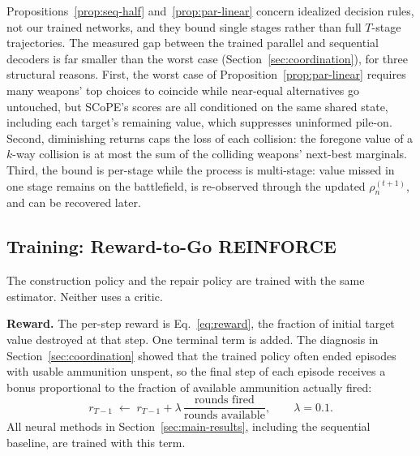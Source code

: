\begin{remark}
\label{rem:gap-interpretation}
Propositions~\ref{prop:seq-half} and~\ref{prop:par-linear} concern idealized decision rules, not our trained networks, and they bound single stages rather than full $T$-stage trajectories. The measured gap between the trained parallel and sequential decoders is far smaller than the worst case (Section~\ref{sec:coordination}), for three structural reasons. First, the worst case of Proposition~\ref{prop:par-linear} requires many weapons' top choices to coincide while near-equal alternatives go untouched, but SCoPE's scores are all conditioned on the same shared state, including each target's remaining value, which suppresses uninformed pile-on. Second, diminishing returns caps the loss of each collision: the foregone value of a $k$-way collision is at most the sum of the colliding weapons' next-best marginals. Third, the bound is per-stage while the process is multi-stage: value missed in one stage remains on the battlefield, is re-observed through the updated $\rho_n^{(t+1)}$, and can be recovered later.
\end{remark}

\subsection{Training: Reward-to-Go REINFORCE}
\label{sec:training}

The construction policy and the repair policy are trained with the same estimator. Neither uses a critic.

\textbf{Reward.} The per-step reward is Eq.~\eqref{eq:reward}, the fraction of initial target value destroyed at that step. One terminal term is added. The diagnosis in Section~\ref{sec:coordination} showed that the trained policy often ended episodes with usable ammunition unspent, so the final step of each episode receives a bonus proportional to the fraction of available ammunition actually fired:
\begin{equation}
\label{eq:ammo-bonus}
r_{T-1} \;\leftarrow\; r_{T-1} + \lambda\,\frac{\text{rounds fired}}{\text{rounds available}}, \qquad \lambda = 0.1.
\end{equation}
All neural methods in Section~\ref{sec:main-results}, including the sequential baseline, are trained with this term.

